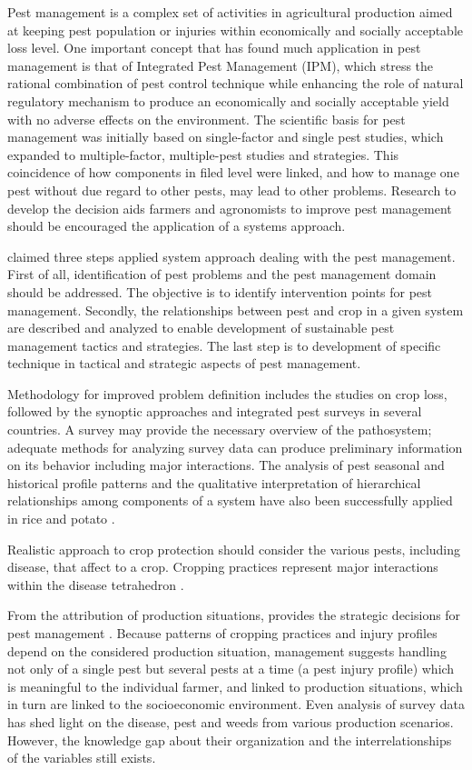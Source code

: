 Pest management is a complex set of activities in agricultural production aimed at keeping pest population or injuries within economically and socially acceptable loss level. One important concept that has found much application in pest management is that of Integrated Pest Management (IPM), which stress the rational combination of pest control technique while enhancing the role of natural regulatory mechanism to produce an economically and socially acceptable yield with no adverse effects on the environment. The scientific basis for pest management was initially based on single-factor and single pest studies, which expanded to multiple-factor, multiple-pest studies and strategies. This coincidence of how components in filed level were linked, and how to manage one pest without due regard to other pests, may lead to other problems. Research to develop the decision aids farmers and agronomists to improve pest management should be encouraged the application of a systems approach.

\citet{teng1992implementing} claimed three steps applied system approach dealing with the pest management. First of all, identification of pest problems and the pest management domain should be addressed. The objective is to identify intervention points for pest management. Secondly, the relationships between pest and crop in a given system are described and analyzed to enable development of sustainable pest management tactics and strategies. The last step is to development of specific technique in tactical and strategic aspects of pest management.

Methodology for improved problem definition includes the studies on crop loss, followed by the synoptic approaches and integrated pest surveys in several countries. A survey may provide the necessary overview of the pathosystem; adequate methods for analyzing survey data can produce preliminary information on its behavior including major interactions. The analysis of pest seasonal and historical profile patterns and the qualitative interpretation of hierarchical relationships among components of a system have also been successfully applied in rice and potato \citep{teng1992implementing, heong1985systems}. 

Realistic approach to crop protection should consider the various pests, including disease, that affect to a crop. Cropping practices represent major interactions within the disease tetrahedron \cite{Zadoks:1979ts}.

From the attribution of production situations, provides the strategic decisions for pest management \cite{Mew:2004kh}. Because patterns of cropping practices and injury profiles depend on the considered production situation, management suggests handling not only of a single pest but several pests at a time (a pest injury profile) which is meaningful to the individual farmer, and linked to production situations, which in turn are linked to the socioeconomic environment. 
Even analysis of survey data has shed light on the disease, pest and weeds from various production scenarios. However, the knowledge gap about their organization and the interrelationships of the variables still exists.


